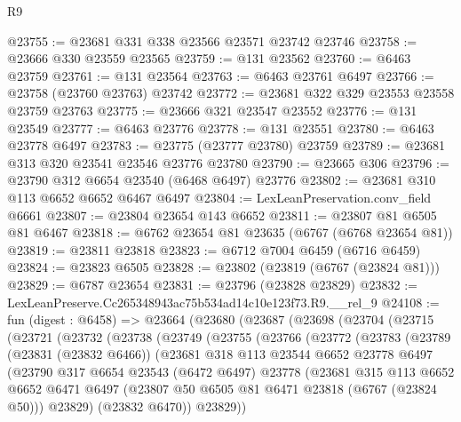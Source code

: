 \begin{lexlean}{R9}
\begin{coremodule}
@23755 := @23681 @331 @338 @23566 @23571 @23742 @23746
@23758 := @23666 @330 @23559 @23565
@23759 := @131 @23562
@23760 := @6463 @23759
@23761 := @131 @23564
@23763 := @6463 @23761 @6497
@23766 := @23758 (@23760 @23763) @23742
@23772 := @23681 @322 @329 @23553 @23558 @23759 @23763
@23775 := @23666 @321 @23547 @23552
@23776 := @131 @23549
@23777 := @6463 @23776
@23778 := @131 @23551
@23780 := @6463 @23778 @6497
@23783 := @23775 (@23777 @23780) @23759
@23789 := @23681 @313 @320 @23541 @23546 @23776 @23780
@23790 := @23665 @306
@23796 := @23790 @312 @6654 @23540 (@6468 @6497) @23776
@23802 := @23681 @310 @113 @6652 @6652 @6467 @6497
@23804 := LexLeanPreservation.conv_field @6661
@23807 := @23804 @23654 @143 @6652
@23811 := @23807 @81 @6505 @81 @6467
@23818 := @6762 @23654 @81 @23635 (@6767 (@6768 @23654 @81))
@23819 := @23811 @23818
@23823 := @6712 @7004 @6459 (@6716 @6459)
@23824 := @23823 @6505
@23828 := @23802 (@23819 (@6767 (@23824 @81)))
@23829 := @6787 @23654
@23831 := @23796 (@23828 @23829)
@23832 := LexLeanPreserve.Cc265348943ac75b534ad14c10e123f73.R9.__rel_9
@24108 := fun (digest : @6458) =>
  @23664
    (@23680
      (@23687
        (@23698
          (@23704
            (@23715
              (@23721
                (@23732
                  (@23738
                    (@23749
                      (@23755
                        (@23766
                          (@23772
                            (@23783
                              (@23789
                                (@23831 (@23832 @6466))
                                (@23681
                                  @318
                                  @113
                                  @23544
                                  @6652
                                  @23778
                                  @6497
                                  (@23790
                                    @317
                                    @6654
                                    @23543
                                    (@6472 @6497)
                                    @23778
                                    (@23681
                                      @315
                                      @113
                                      @6652
                                      @6652
                                      @6471
                                      @6497
                                      (@23807 @50 @6505 @81 @6471 @23818 (@6767 (@23824 @50)))
                                      @23829)
                                    (@23832 @6470))
                                  @23829))

\end{coremodule}
\end{lexlean}
